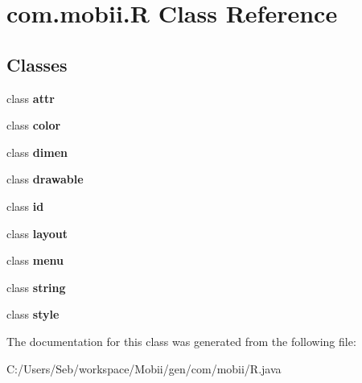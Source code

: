 \hypertarget{classcom_1_1mobii_1_1_r}{\section{com.\-mobii.\-R Class Reference}
\label{classcom_1_1mobii_1_1_r}
}
\subsection*{Classes}
\begin{DoxyCompactItemize}
\item 
class {\bfseries attr}
\item 
class {\bfseries color}
\item 
class {\bfseries dimen}
\item 
class {\bfseries drawable}
\item 
class {\bfseries id}
\item 
class {\bfseries layout}
\item 
class {\bfseries menu}
\item 
class {\bfseries string}
\item 
class {\bfseries style}
\end{DoxyCompactItemize}


The documentation for this class was generated from the following file\-:\begin{DoxyCompactItemize}
\item 
C\-:/\-Users/\-Seb/workspace/\-Mobii/gen/com/mobii/R.\-java\end{DoxyCompactItemize}
